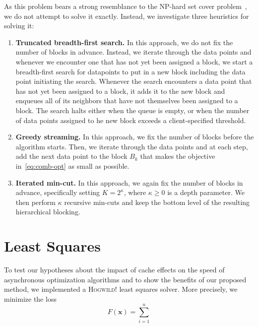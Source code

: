 \documentclass[times,11pt]{article}
\numberwithin{equation}{section}		%
\numberwithin{figure}{section}			%
\numberwithin{table}{section}				%
\newcommand{\xvec}{\mathbf{x}}
\newcommand{\HW}{\textsc{Hogwild!}}
\begin{document}
As this problem bears a strong resemblance to the NP-hard set cover problem~\citep{}, we do not attempt to solve it exactly. Instead, we investigate three heuristics for solving it:
\begin{enumerate}
\item
{\bf Truncated breadth-first search.} In this approach, we do not fix the number of blocks in advance. Instead, we iterate through the data points and whenever we encounter one that has not yet been assigned a block, we start a breadth-first search for datapoints to put in a new block including the data point initiating the 
search. Whenever the search encounters a data point that has not yet been assigned to a block, it adds it to the new block and enqueues all of its neighbors that have not themselves been assigned to a block. The search halts either when the queue is empty, or when the number of data points assigned to he new block
exceeds a client-specified threshold.

\item
{\bf Greedy streaming.} In this approach, we fix the number of blocks before the algorithm starts. Then, we iterate through the data points and at each step, add the next data point to the block $B_{k}$ that makes the objective in~\eqref{eq:comb-opt} as small as possible.

\item
{\bf Iterated min-cut.} In this approach, we again fix the number of blocks in advance, specifically setting $K = 2^{\kappa}$, where $\kappa \geq 0$ is a depth parameter. We then perform $\kappa$ recursive min-cuts and keep the bottom level of the resulting hierarchical blocking.
\end{enumerate}

\section{Least Squares}\label{sec:ls}

To test our hypotheses about the impact of cache effects on the speed of asynchronous optimization algorithms and to show the benefits of our proposed method, we implemented a \HW{} least squares solver. More precisely, we minimize the loss 
\begin{equation}
F(\xvec) = \sum_{i = 1}^n 
\end{equation}
\end{document}
